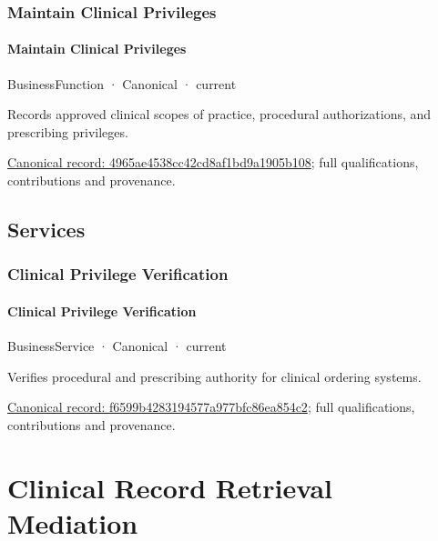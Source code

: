 \subsubsection{Maintain Clinical Privileges}

\paragraph{Maintain Clinical Privileges}

\label{element:4965ae4538cc42cd8af1bd9a1905b108}
{\small BusinessFunction · Canonical · current}\par

Records approved clinical scopes of practice, procedural authorizations, and prescribing privileges.


{\footnotesize \href{../../../../continuum/business/business-function/4965ae4538cc42cd8af1bd9a1905b108.md}{Canonical record: 4965ae4538cc42cd8af1bd9a1905b108}; full qualifications, contributions and provenance.}\par
\subsection{Services}

\subsubsection{Clinical Privilege Verification}

\paragraph{Clinical Privilege Verification}

\label{element:f6599b4283194577a977bfc86ea854c2}
{\small BusinessService · Canonical · current}\par

Verifies procedural and prescribing authority for clinical ordering systems.


{\footnotesize \href{../../../../continuum/business/business-service/f6599b4283194577a977bfc86ea854c2.md}{Canonical record: f6599b4283194577a977bfc86ea854c2}; full qualifications, contributions and provenance.}\par
\section{Clinical Record Retrieval Mediation}

